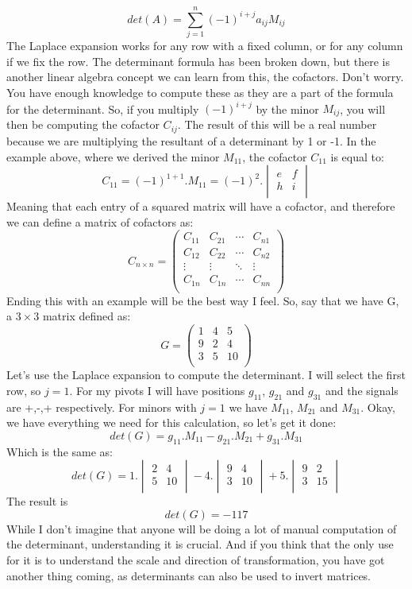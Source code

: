 \documentclass[600paper, 11pt,twoside,openany]{kdp}
\begin{document}
\[det(A) = \sum_{j=1}^n(-1)^{i+j}a_{ij}M_{ij}\]
\indent The Laplace expansion works for any row with a fixed column, or for any column if we fix the row. The determinant formula has been broken down, but there is another linear algebra concept we can learn from this, the cofactors. Don’t worry. You have enough knowledge to compute these as they are a part of the formula for the determinant. So, if you multiply  $(-1)^{i+j}$  by the minor $M_{ij}$, you will then be computing the cofactor $C_{ij}$. The result of this will be a real number because we are multiplying the resultant of a determinant by 1 or -1. In the example above, where we derived the minor $M_{11}$, the cofactor $C_{11}$ is equal to:
\[C_{11} = (-1)^{1+1}.M_{11} =  (-1)^{2}.\begin{vmatrix}
e & f  \\
h & i \\
\end{vmatrix}\]
\indent Meaning that each entry of a squared matrix will have a cofactor, and therefore we can define a matrix of cofactors as:
 \[C_{n \times n } = 
\begin{pmatrix}
C_{11} & C_{21} & \cdots & C_{n1}\\
C_{12} & C_{22} &\cdots & C_{n2} \\
\vdots & \vdots & \ddots & \vdots \\
C_{1n} & C_{1n}& \cdots & C_{nn}\\
\end{pmatrix}
\]
\indent Ending this with an example will be the best way I feel. So, say that we have G, a $3 \times 3$ matrix defined as:
\[ G = 
\begin{pmatrix}
1 & 4 & 5 \\
9 & 2 & 4 \\
3 & 5 & 10 \\
\end{pmatrix}
\]
\indent Let’s use the Laplace expansion to compute the determinant. I will select the first row, so $j=1$. For my pivots I will have positions $g_{11}$, $g_{21}$ and $g_{31}$ and the signals are +,-,+ respectively. For minors with  $j=1$ we have $M_{11}$, $M_{21}$ and $M_{31}$. Okay, we have everything we need for this calculation, so let’s get it done:
\[det(G) =  g_{11}.M_{11} - g_{21}.M_{21} + g_{31}.M_{31}\]
\indent Which is the same as:
\[det(G) = 1.\begin{vmatrix}
2 & 4\\
5 & 10\\
\end{vmatrix} - 4.\begin{vmatrix}
9 & 4\\
3 & 10\\
\end{vmatrix} +  5.\begin{vmatrix}
9 & 2\\
3 & 15\\
\end{vmatrix}\]
\indent The result is 
\[det(G) =  -117\]
\indent While I don’t imagine that anyone will be doing a lot of manual computation of the determinant, understanding it is crucial. And if you think that the only use for it is to understand the scale and direction of transformation, you have got another thing coming, as determinants can also be used to invert matrices.
\end{document}
